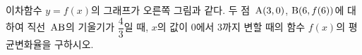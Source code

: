 \noindent\begin{minipage}[t]{0.58\linewidth}\vspace{0pt}\raggedright 이차함수 $y=f(x)$의 그래프가 오른쪽 그림과 같다. 두 점~$\mathrm{A}(3{,}\mkern3mu\mathopen{}0)$, $\mathrm{B}(6{,}\mkern3mu\mathopen{}f(6))$에 대하여 직선~$\mathrm{AB}$의 기울기가 $\dfrac{4}{3}$일 때, $x$의 값이 0에서 3까지 변할 때의 함수 $f(x)$의 평균변화율을 구하시오. \end{minipage}\hfill\begin{minipage}[t]{0.4\linewidth}\vspace{0pt}\centering \resizebox{\ifdim\width>\linewidth\linewidth\else\width\fi}{!}{}\end{minipage}\par
